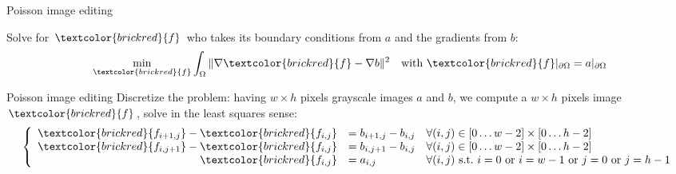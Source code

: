 \documentclass[UKenglish,aspectratio=169]{beamer}
\newcommand\unknown[1]{\textcolor{brickred}{#1}}
\begin{document}
\begin{frame}{Poisson image editing}
\begin{minipage}{.12\linewidth}
\end{minipage}
\qquad
\pause
\begin{minipage}{.6\linewidth}
Solve for $\unknown{f}$ who takes its boundary conditions from $a$ and the gradients from $b$:
$$
\min\limits_{\unknown{f}} \int_\Omega \|\nabla \unknown{f} - \nabla b\|^2 \quad \text{with~} \unknown{f}|_{\partial\Omega} = a|_{\partial\Omega}
$$
\end{minipage}
\end{frame}

\begin{frame}{Poisson image editing}
Discretize the problem: having $w \times h$ pixels grayscale images $a$ and $b$,
we compute a $w \times h$ pixels image $\unknown{f}$, solve in the least squares sense:
$$
\left \{ \begin{array}{rll}
\unknown{f_{i+1, j}}-\unknown{f_{i,j}} & = b_{i+1, j}-b_{i,j} & \forall (i,j) \in [0 \dots w-2] \times [0\dots h-2]\\
\unknown{f_{i, j+1}}-\unknown{f_{i,j}} & = b_{i, j+1}-b_{i,j} & \forall (i,j) \in [0 \dots w-2] \times [0\dots h-2]\\
\unknown{f_{i,j}}            & = a_{i,j}            & \forall (i,j) \text{~s.t.~} i=0 \text{~or~} i=w-1 \text{~or~} j=0 \text{~or~} j=h-1
\end{array} \right.
$$
\end{frame}
\end{document}
